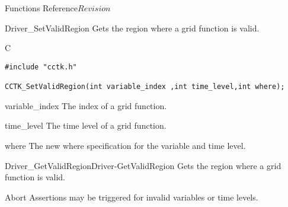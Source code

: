 \begin{cactuspart}{ Functions Reference}{}{$Revision$}
\begin{FunctionDescription}{Driver\_SetValidRegion}
\label{Driver-SetValidRegion}
Gets the region where a grid function is valid.
\begin{SynopsisSection}
\begin{Synopsis}{C}
\begin{verbatim}
#include "cctk.h"

CCTK_SetValidRegion(int variable_index ,int time_level,int where);

\end{verbatim}
\end{Synopsis}
\end{SynopsisSection}


\begin{ParameterSection}
\begin{Parameter}{variable\_index}
The index of a grid function.
\end{Parameter}
\end{ParameterSection}

\begin{ParameterSection}
\begin{Parameter}{time\_level}
The time level of a grid function.
\end{Parameter}
\end{ParameterSection}

\begin{ParameterSection}
\begin{Parameter}{where}
The new where specification for the variable and time level.
\end{Parameter}
\end{ParameterSection}

\begin{SeeAlsoSection}
\begin{SeeAlso2}{Driver\_GetValidRegion}{Driver-GetValidRegion}
Gets the region where a grid function is valid.
\end{SeeAlso2}
\end{SeeAlsoSection}

\begin{ErrorSection}
\begin{Error}{Abort}
Assertions may be triggered for invalid variables or time levels.
\end{Error}
\end{ErrorSection}
\end{FunctionDescription}

\end{cactuspart}
